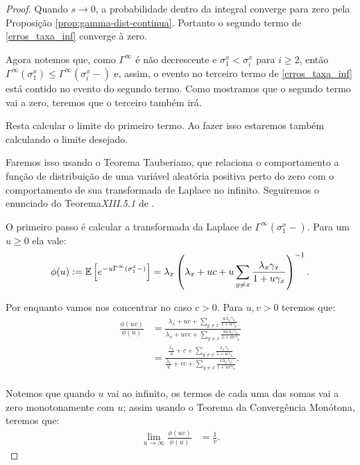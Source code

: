 \begin{proof}
  Quando $s \to 0$, a probabilidade dentro da integral converge para
  zero pela Proposição \ref{prop:gamma-dist-continua}. Portanto o
  segundo termo de \eqref{erros_taxa_inf} converge à zero.

  Agora notemos que, como $\Gamma^\infty$ é não decrescente e $\sigma^x_1
  < \sigma^x_i$ para $i \geq 2$, então $\Gamma^\infty(\sigma^x_1) \leq
  \Gamma^\infty(\sigma^x_i -)$ e, assim, o evento no terceiro termo de
  \eqref{erros_taxa_inf} está contido no evento do segundo
  termo. Como mostramos que o segundo termo vai a zero, teremos
  que o terceiro também irá.

  Resta calcular o limite do primeiro termo. Ao fazer isso
  estaremos também calculando o limite desejado.

  Faremos isso usando o Teorema Tauberiano, que relaciona o
  comportamento a função de distribuição de uma variável aleatória
  positiva perto do zero com o comportamento de sua transformada de
  Laplace no infinito.  Seguiremos o enunciado do
  Teorema\emph{XIII.5.1} de \cite{fellerv2}.

  O primeiro passo é calcular a transformada da Laplace de
  $\Gamma^\infty(\sigma^x_1-)$. Para um $u \geq 0$ ela vale:
  \begin{align*}
    \phi (u) := {\mathbb{E}} \left[ e^{-u \Gamma^\infty (\sigma^x_1-)}  \right] =
    \lambda_x \left( \lambda_x + uc + u \sum_{y \neq x}
      \frac{\lambda_x \gamma_x}{1 + u\gamma_x}  \right)^{-1}.
  \end{align*}

  Por enquanto vamos nos concentrar no caso $c > 0$. Para $u, v > 0$
  teremos que:
  \begin{align*}
    \frac{\phi(uv)}{\phi (u)} &= \frac{\lambda_x + uc + \sum_{y \neq
        x} \frac{u \lambda_x\gamma_x}{1 + u \gamma_x}} {\lambda_x + u
      v c + \sum_{y \neq x} \frac{u v
        \lambda_x\gamma_x}{1 + u v \gamma_x}} \\
    &= \frac{\frac{\lambda_x}{u} + c + \sum_{y \neq x}
      \frac{\lambda_x\gamma_x}{1 + u \gamma_x}} {\frac{\lambda_x}{u} +
      v c + \sum_{y \neq x} \frac{v
        \lambda_x\gamma_x}{1 + u v \gamma_x}}. \\
  \end{align*}

  Notemos que quando $u$ vai ao infinito, os termos de cada uma das
  somas vai a zero monotonamente com $u$; assim usando o Teorema da
  Convergência Monótona, teremos que:
  \begin{align*}
      \lim_{u \to \infty} \frac{\phi(uv)}{\phi (u)} &= \frac{1}{v}.
  \end{align*}


\end{proof}
